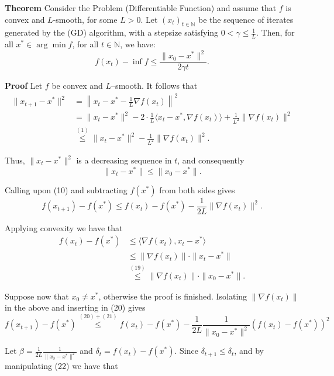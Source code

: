 \documentclass{article}
\begin{document}
\textbf{Theorem} Consider the Problem (Differentiable Function) and assume that \( f \) is convex
and \( L \)-smooth, for some \( L > 0 \). Let \( (x_t)_{t\in\mathbb{N}} \) be the sequence of iterates generated by the (GD)
algorithm, with a stepsize satisfying \( 0 < \gamma \le \frac{1}{L} \). Then, for all \( x^* \in \arg\min f \), for all \( t \in \mathbb{N} \), we have:
\[
f(x_t) - \inf f \le \frac{\|x_0 - x^*\|^2}{2\gamma t}.
\]

\textbf{Proof} Let $f$ be convex and $L$–smooth. It follows that
\begin{align*}
\|x_{t+1} - x^*\|^2 
&= \left\|x_t - x^* - \frac{1}{L} \nabla f(x_t) \right\|^2 \\
&= \|x_t - x^*\|^2 
   - 2 \cdot \frac{1}{L} \langle x_t - x^*, \nabla f(x_t) \rangle 
   + \frac{1}{L^2} \|\nabla f(x_t)\|^2  \\
&\overset{(1)}{\le} \|x_t - x^*\|^2 - \frac{1}{L^2} \|\nabla f(x_t)\|^2. \tag{18}
\end{align*}

Thus, \( \|x_t - x^*\|^2 \) is a decreasing sequence in \( t \), and consequently
\begin{equation}
\|x_t - x^*\| \le \|x_0 - x^*\|. \tag{19}
\end{equation}

Calling upon (10) and subtracting \( f(x^*) \) from both sides gives
\begin{equation}
f(x_{t+1}) - f(x^*) \le f(x_t) - f(x^*) - \frac{1}{2L} \|\nabla f(x_t)\|^2. \tag{20}
\end{equation}

Applying convexity we have that
\begin{align}
f(x_t) - f(x^*) &\le \langle \nabla f(x_t), x_t - x^* \rangle \nonumber \\
&\le \|\nabla f(x_t)\| \cdot \|x_t - x^*\| \nonumber \\
&\overset{(19)}{\le} \|\nabla f(x_t)\| \cdot \|x_0 - x^*\|. \tag{21}
\end{align}

Suppose now that \( x_0 \neq x^* \), otherwise the proof is finished. Isolating \( \| \nabla f(x_t) \| \) in the above and inserting in (20) gives
\[
f(x_{t+1}) - f(x^*) \overset{(20) + (21)}{\leq} f(x_t) - f(x^*) - \frac{1}{2L} \frac{1}{\|x_0 - x^*\|^2} ( f(x_t) - f(x^*) )^2  \tag{22}
\]

Let \( \beta = \frac{1}{2L} \frac{1}{\|x_0 - x^*\|^2} \)  \quad  and \( \delta_t = f(x_t) - f(x^*) \). Since \( \delta_{t+1} \leq \delta_t \), and by manipulating (22) we have that
\end{document}
